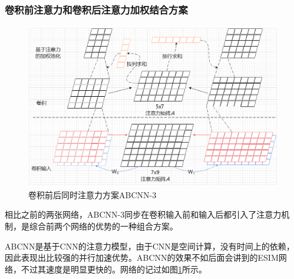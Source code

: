 \documentclass[twoside,a4paper,12pt]{book}%
\begin{document}
\subsubsection{卷积前注意力和卷积后注意力加权结合方案}
\begin{figure}[h]
	\begin{center}
		\includegraphics[width=6.0in]{figures/abcnn3.png}
		\caption{卷积前后同时注意力方案ABCNN-3}
		\label{fig:abcnn3}
	\end{center}
\end{figure}
相比之前的两张网络，ABCNN-3同步在卷积输入前和输入后都引入了注意力机制，是综合前两个网络的优势的一种组合方案。

ABCNN是基于\gls{CNN}的注意力模型，由于\gls{CNN}是空间计算，没有时间上的依赖，因此表现出比较强的并行加速优势。ABCNN的效果不如后面会讲到的ESIM网络，不过其速度是明显更快的。网络的记过如图\ref{fig:abcnn3}所示。
\end{document}
